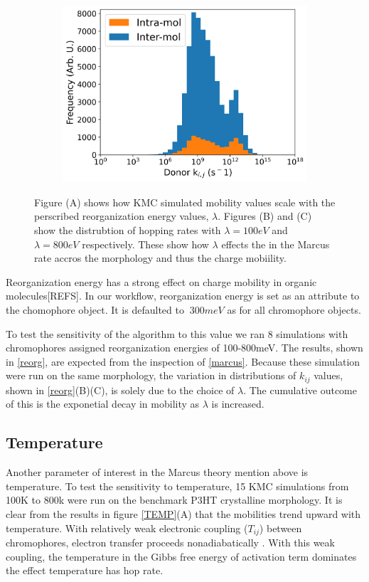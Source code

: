 \begin{figure}[]
\begin{subfigure}{.5\textwidth}
    \includegraphics[width=\textwidth]{figures/donor_hopping_rate_clusters_reorg800.png}
\end{subfigure}
    \caption[short]{Figure (A) shows how KMC simulated mobility values scale with the perscribed
    reorganization energy values, $\lambda$. Figures (B) and (C) show the distrubtion of hopping rates with
    $\lambda = 100eV$ and $\lambda = 800eV$ respectively. These show how $\lambda$ effects the in the Marcus
    rate accros the morphology and thus the charge mobiility.}
\label{reorg}
\end{figure}

Reorganization energy has a strong effect on charge mobility in organic
molecules[REFS]. In our workflow, reorganization energy is set as an attribute
to the chomophore object. It is defaulted to $~300meV$ as for all chromophore
objects.

To test the sensitivity of the algorithm to this value we ran 8
simulations with chromophores assigned reorganization energies of 100-800meV. The results, shown in
\autoref{reorg}, are expected from the inspection of \autoref{marcus}. Because these simulation were run on
the same morphology, the variation in distributions of $k_{ij}$ values, shown in \autoref{reorg}(B)(C), is
solely due to the choice of $\lambda$. The cumulative outcome of this is the exponetial decay in mobility as
$\lambda$ is increased.

\subsection{Temperature}

Another parameter of interest in the Marcus theory mention above is temperature. To test the sensitivity to
temperature, 15 KMC simulations from 100K to 800k were run on the benchmark P3HT crystalline morphology. It
is clear from the results in figure \ref{TEMP}(A) that the mobilities trend upward with temperature. With relatively
weak electronic coupling ($T_{ij}$) between chromophores, electron transfer proceeds nonadiabatically
\cite{clarke2010}. With this weak coupling, the temperature in the Gibbs free energy of activation term
dominates the effect temperature has hop rate.

